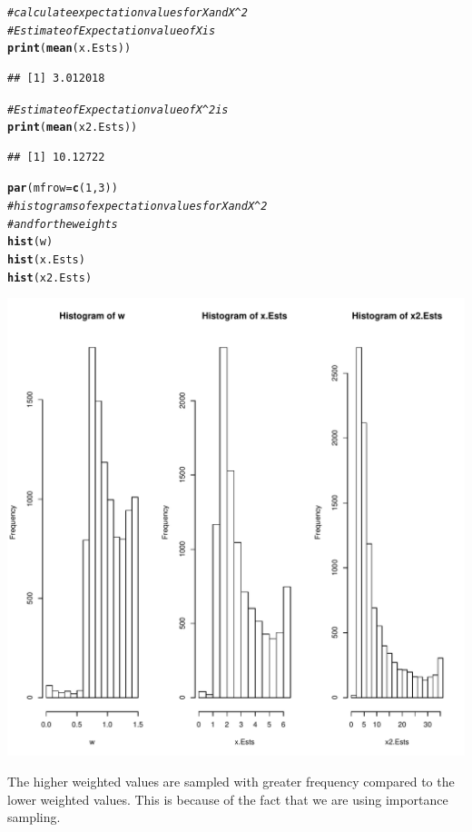 \documentclass{article}\usepackage[]{graphicx}\usepackage[]{color}
\makeatletter
\def\maxwidth{ %
  \ifdim\Gin@nat@width>\linewidth
    \linewidth
  \else
    \Gin@nat@width
  \fi
}
\newcommand{\hlnum}[1]{\textcolor[rgb]{0.686,0.059,0.569}{#1}}%
\newcommand{\hlcom}[1]{\textcolor[rgb]{0.678,0.584,0.686}{\textit{#1}}}%
\newcommand{\hlstd}[1]{\textcolor[rgb]{0.345,0.345,0.345}{#1}}%
\newcommand{\hlkwc}[1]{\textcolor[rgb]{0.333,0.667,0.333}{#1}}%
\newcommand{\hlkwd}[1]{\textcolor[rgb]{0.737,0.353,0.396}{\textbf{#1}}}%
\newenvironment{kframe}{%
 \def\at@end@of@kframe{}%
 \ifinner\ifhmode%
  \def\at@end@of@kframe{\end{minipage}}%
  \begin{minipage}{\columnwidth}%
 \fi\fi%
 \def\FrameCommand##1{\hskip\@totalleftmargin \hskip-\fboxsep
 \colorbox{shadecolor}{##1}\hskip-\fboxsep
     \hskip-\linewidth \hskip-\@totalleftmargin \hskip\columnwidth}%
 \MakeFramed {\advance\hsize-\width
   \@totalleftmargin\z@ \linewidth\hsize
   \@setminipage}}%
 {\par\unskip\endMakeFramed%
 \at@end@of@kframe}
\newenvironment{knitrout}{}{} %
\makeatother
\begin{document}
\begin{knitrout}
\begin{kframe}
\begin{alltt}
\hlcom{#calculate expectation values for X and X^2}
\hlcom{#Estimate of Expectation value of X is}
\hlkwd{print}\hlstd{(}\hlkwd{mean}\hlstd{(x.Ests))}
\end{alltt}
\begin{verbatim}
## [1] 3.012018
\end{verbatim}
\begin{alltt}
\hlcom{#Estimate of Expectation value of X^2 is}
\hlkwd{print}\hlstd{(}\hlkwd{mean}\hlstd{(x2.Ests))}
\end{alltt}
\begin{verbatim}
## [1] 10.12722
\end{verbatim}
\begin{alltt}
\hlkwd{par}\hlstd{(}\hlkwc{mfrow}\hlstd{=}\hlkwd{c}\hlstd{(}\hlnum{1}\hlstd{,}\hlnum{3}\hlstd{))}
\hlcom{#histograms of expectation values for X and X^2}
\hlcom{#and for the weights}
\hlkwd{hist}\hlstd{(w)}
\hlkwd{hist}\hlstd{(x.Ests)}
\hlkwd{hist}\hlstd{(x2.Ests)}
\end{alltt}
\end{kframe}
\includegraphics[width=\maxwidth]{figure/unnamed-chunk-2-1} 

\end{knitrout}
The higher weighted values are sampled with greater frequency compared to the lower weighted values.  This is because of the fact that we are using importance sampling.
\end{document}
